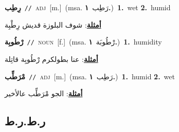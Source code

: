 \documentclass[10pt,a4paper,twoside]{article} %
\begin{document}
\begin{multicols}{2}
{\setlength\topsep{0pt}\textbf{\foreignlanguage{arabic}{رِطِب}}\ {\color{gray}\texttt{//}\color{black}}\ \textsc{adj}\ [m.]\ \color{gray}(msa. \foreignlanguage{arabic}{رَطِب}~\foreignlanguage{arabic}{\textbf{١.}})\color{black}\ \textbf{1.}~wet  \textbf{2.}~humid\  \begin{flushright}\color{gray}\foreignlanguage{arabic}{\textbf{\underline{\foreignlanguage{arabic}{أمثلة}}}: شوف البلوزة قديش رِطْبِة}\end{flushright}\color{black}} \vspace{2mm}

{\setlength\topsep{0pt}\textbf{\foreignlanguage{arabic}{رْطُوبِة}}\ {\color{gray}\texttt{//}\color{black}}\ \textsc{noun}\ [f.]\ \color{gray}(msa. \foreignlanguage{arabic}{رْطُوبَة}~\foreignlanguage{arabic}{\textbf{١.}})\color{black}\ \textbf{1.}~humidity\  \begin{flushright}\color{gray}\foreignlanguage{arabic}{\textbf{\underline{\foreignlanguage{arabic}{أمثلة}}}: عنا بطولكرم رْطُوبِة قاتِلة}\end{flushright}\color{black}} \vspace{2mm}

{\setlength\topsep{0pt}\textbf{\foreignlanguage{arabic}{مْرَطِّب}}\ {\color{gray}\texttt{//}\color{black}}\ \textsc{adj}\ [m.]\ \color{gray}(msa. \foreignlanguage{arabic}{رَطِب}~\foreignlanguage{arabic}{\textbf{١.}})\color{black}\ \textbf{1.}~humid  \textbf{2.}~wet\  \begin{flushright}\color{gray}\foreignlanguage{arabic}{\textbf{\underline{\foreignlanguage{arabic}{أمثلة}}}: الجو مْرَطِّب عالأخير}\end{flushright}\color{black}} \vspace{2mm}

\vspace{-3mm}
\subsection*{\color{blue}\foreignlanguage{arabic}{ر.ط.ر.ط}\color{blue}{}} 


\end{multicols}
\end{document}
